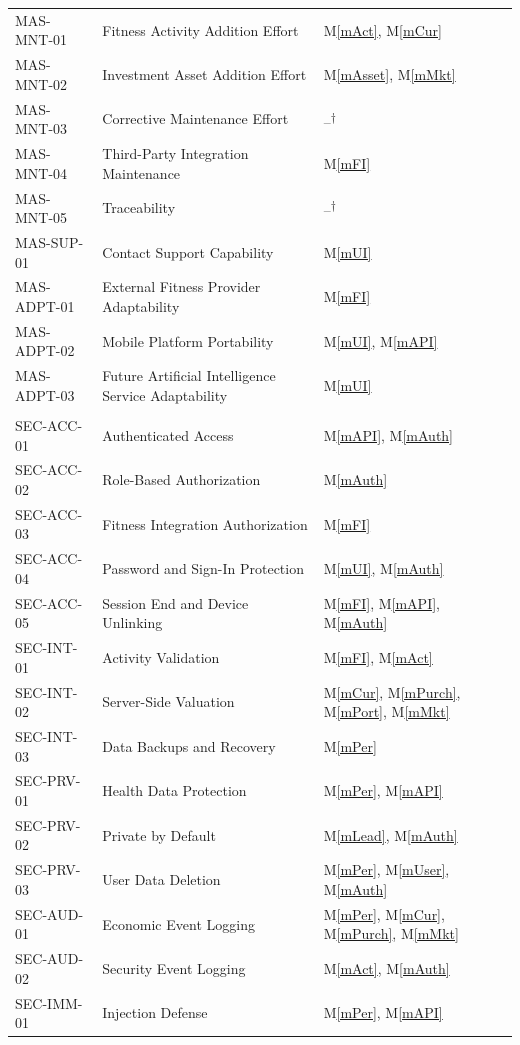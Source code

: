 \documentclass[12pt, titlepage]{article}
\newcommand{\mref}[1]{M\ref{#1}}
\begin{document}
{\begin{longtable}{>{\raggedright\arraybackslash}p{}
  >{\raggedright\arraybackslash}p{}
  >{\raggedright\arraybackslash}p{}}
MAS-MNT-01 & Fitness Activity Addition Effort & \mref{mAct}, \mref{mCur}\\
MAS-MNT-02 & Investment Asset Addition Effort & \mref{mAsset}, \mref{mMkt}\\
MAS-MNT-03 & Corrective Maintenance Effort & --\textsuperscript{$\dagger$}\\
MAS-MNT-04 & Third-Party Integration Maintenance & \mref{mFI}\\
MAS-MNT-05 & Traceability & --\textsuperscript{$\dagger$}\\
MAS-SUP-01 & Contact Support Capability & \mref{mUI}\\
MAS-ADPT-01 & External Fitness Provider Adaptability & \mref{mFI}\\
MAS-ADPT-02 & Mobile Platform Portability & \mref{mUI}, \mref{mAPI}\\
MAS-ADPT-03 & Future Artificial Intelligence Service Adaptability & \mref{mUI}\\
\midrule
\multicolumn{3}{l}{\textit{Security Requirements}}\\
SEC-ACC-01 & Authenticated Access & \mref{mAPI}, \mref{mAuth}\\
SEC-ACC-02 & Role-Based Authorization & \mref{mAuth}\\
SEC-ACC-03 & Fitness Integration Authorization & \mref{mFI}\\
SEC-ACC-04 & Password and Sign-In Protection & \mref{mUI}, \mref{mAuth}\\
SEC-ACC-05 & Session End and Device Unlinking & \mref{mFI}, \mref{mAPI}, \mref{mAuth}\\
SEC-INT-01 & Activity Validation & \mref{mFI}, \mref{mAct}\\
SEC-INT-02 & Server-Side Valuation & \mref{mCur}, \mref{mPurch}, \mref{mPort}, \mref{mMkt}\\
SEC-INT-03 & Data Backups and Recovery & \mref{mPer}\\
SEC-PRV-01 & Health Data Protection & \mref{mPer}, \mref{mAPI}\\
SEC-PRV-02 & Private by Default & \mref{mLead}, \mref{mAuth}\\
SEC-PRV-03 & User Data Deletion & \mref{mPer}, \mref{mUser}, \mref{mAuth}\\
SEC-AUD-01 & Economic Event Logging & \mref{mPer}, \mref{mCur}, \mref{mPurch}, \mref{mMkt}\\
SEC-AUD-02 & Security Event Logging & \mref{mAct}, \mref{mAuth}\\
SEC-IMM-01 & Injection Defense & \mref{mPer}, \mref{mAPI}\\

\end{longtable}}
\end{document}
